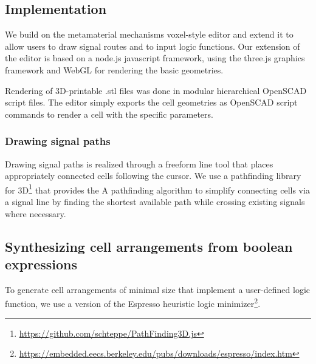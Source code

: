\subsection{Implementation}
We build on the metamaterial mechanisms voxel-style editor and extend it to allow users to draw signal routes and to input logic functions. Our extension of the editor is based on a node.js javascript framework, using the three.js graphics framework and WebGL for rendering the basic geometries.

Rendering of 3D-printable .stl files was done in modular hierarchical OpenSCAD script files. The editor simply exports the cell geometries as OpenSCAD script commands to render a cell with the specific parameters.

\subsubsection{Drawing signal paths}
Drawing signal paths is realized through a freeform line tool that places appropriately connected cells following the cursor. We use a pathfinding library for 3D\footnote{\url{https://github.com/schteppe/PathFinding3D.js}} that provides the A\* pathfinding algorithm to simplify connecting cells via a signal line by finding the shortest available path while crossing existing signals where necessary.


\subsection{Synthesizing cell arrangements from boolean expressions}
To generate cell arrangements of minimal size that implement a user-defined logic function, we use a version of the Espresso heuristic logic minimizer\footnote{\url{https://embedded.eecs.berkeley.edu/pubs/downloads/espresso/index.htm}}. 


